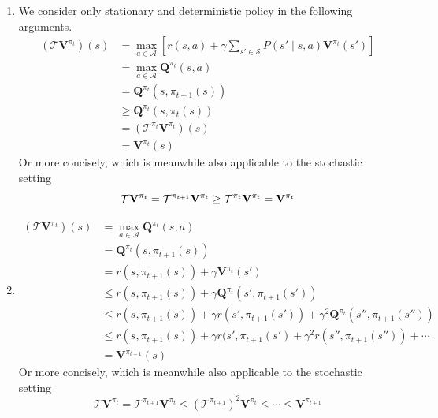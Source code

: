 \begin{Solution}
    \begin{enumerate} [label=\alph*)]
        \item
        We consider only stationary and deterministic policy in the following arguments. 
        $$
        \begin{aligned}
        (\mathcal{T}\mathbf{V}^{\pi_t})(s) & = \max_{a \in \mathcal{A}} \left [ r(s, a) + \gamma \sum_{s' \in \mathcal{S}}P(s' \mid s,a) \mathbf{V}^{\pi_t}(s') \right ] \\
        & = \max_{a \in \mathcal{A}} \mathbf{Q}^{\pi_t}(s, a) \\
        & = \mathbf{Q}^{\pi_t}(s, \pi_{t+1}(s)) \\
        & \geq \mathbf{Q}^{\pi_t}(s, \pi_t(s)) \\
        & = (\mathcal{T}^{\pi_t}\mathbf{V}^{\pi_t})(s) \\
        & = \mathbf{V}^{\pi_t}(s)
        \end{aligned}
        $$
        Or more concisely, which is meanwhile also applicable to the stochastic setting
        $$
        \mathcal{T}\mathbf{V}^{\pi_t} = \mathcal{T}^{\pi_{t+1}}\mathbf{V}^{\pi_t} \geq \mathcal{T}^{\pi_{t}}\mathbf{V}^{\pi_t} = \mathbf{V}^{\pi_t} \\
        $$
        \item
        $$
        \begin{aligned}
        (\mathcal{T}\mathbf{V}^{\pi_t})(s) & = \max_{a \in \mathcal{A}} \mathbf{Q}^{\pi_t}(s, a) \\
        & = \mathbf{Q}^{\pi_t}(s, \pi_{t+1}(s)) \\
        & = r(s, \pi_{t+1}(s)) + \gamma \mathbf{V}^{\pi_t}(s') \\
        & \leq r(s, \pi_{t+1}(s)) + \gamma \mathbf{Q}^{\pi_t}(s', \pi_{t+1}(s')) \\
        & \leq r(s, \pi_{t+1}(s)) + \gamma r(s', \pi_{t+1}(s')) + \gamma^2 \mathbf{Q}^{\pi_t}(s'', \pi_{t+1}(s'')) \\
        & \leq r(s, \pi_{t+1}(s)) + \gamma r(s', \pi_{t+1}(s') + \gamma^2 r(s'', \pi_{t+1}(s'')) + \cdots \\
        & = \mathbf{V}^{\pi_{t+1}}(s)
        \end{aligned}
        $$
        Or more concisely, which is meanwhile also applicable to the stochastic setting
        $$
        \mathcal{T}\mathbf{V}^{\pi_t} = \mathcal{T}^{\pi_{t+1}}\mathbf{V}^{\pi_t} \leq  (\mathcal{T}^{\pi_{t+1}})^2\mathbf{V}^{\pi_t} \leq \cdots \leq \mathbf{V}^{\pi_{t+1}}
$$
\end{enumerate}
\end{Solution}
